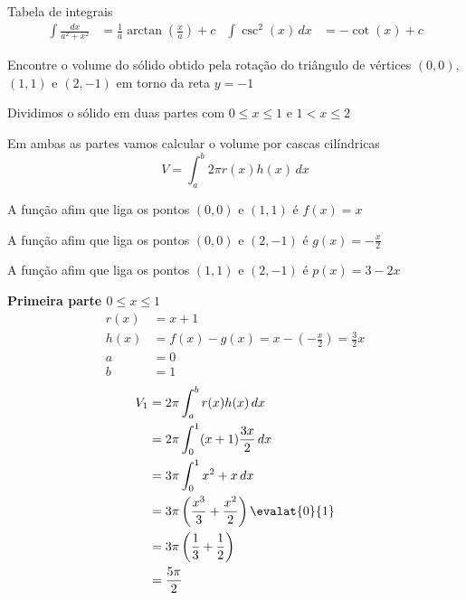 \documentclass[a4paper,12pt,fleqn]{article}
\begin{document}

\vspace{\baselineskip}
Tabela de integrais
\begin{align*}
  \int \frac{dx}{a^2+x^2} & = \frac{1}{a}\arctan\left(\frac{x}{a}\right) + c &
  \int \csc^2(x) \, dx & = -\cot(x) + c
\end{align*}


Encontre o volume do sólido obtido pela rotação do triângulo de vértices
\((0, 0)\), \((1, 1)\) e \((2, -1)\) em torno da reta \(y=-1\)

\begin{answer}
  Dividimos o sólido em duas partes com $0\leq x\leq 1$ e $1<x\leq 2$

  Em ambas as partes vamos calcular o volume por cascas cilíndricas
  \[
    V = \int_a^b 2\pi r(x) h(x) \, dx
  \]

  A função afim que liga os pontos $(0, 0)$ e $(1,  1)$ é $f(x)=x$

  A função afim que liga os pontos $(0, 0)$ e $(2, -1)$ é $g(x)=-\frac{x}{2}$

  A função afim que liga os pontos $(1, 1)$ e $(2, -1)$ é $p(x)=3-2x$

  \textbf{Primeira parte $0\leq x\leq 1$ }
  \begin{align*}
    r(x) & = x + 1                                                     \\
    h(x) & = f(x) - g(x) = x -\left(-\frac{x}{2}\right) = \frac{3}{2}x \\
    a    & = 0                                                         \\
    b    & = 1
  \end{align*}
  \vspace{-2\baselineskip}
  \begin{align*}
    V_1 & = 2\pi \int_a^b r(x) h(x) \, dx                               \\
        & = 2\pi \int_0^1 (x+1) \frac{3x}{2} \, dx                      \\
        & = 3\pi\int_0^1 x^2+x \, dx                                    \\
        & = 3\pi\left(\frac{x^3}{3} + \frac{x^2}{2}\right)\evalat{0}{1} \\
        & = 3\pi \left( \frac{1}{3} + \frac{1}{2}\right)                \\
        & = \frac{5\pi}{2}
  \end{align*}


\end{answer}
\end{document}
